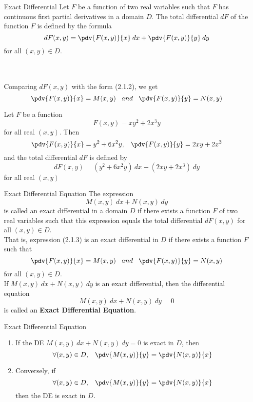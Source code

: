 \begin{definition}{Exact Differential}{}
    Let $F$ be a function of two real variables such that  $F$ has continuous first partial derivatives in a domain $D$. The total differential $dF$ of the function $F$ is defined by the formula
    \[
        d{F(x,y)} = \pdv{F(x,y)}{x} \: dx + \pdv{F(x,y)}{y} \: dy
    \]
    for all $(x,y) \in D$.
\end{definition} \\~\\

Comparing $dF(x,y)$ with the form (2.1.2), we get
\[
    \pdv{F(x,y)}{x} = M(x,y) \;\;\; and \;\;\;
    \pdv{F(x,y)}{y} = N(x,y)
\]

\begin{example}{}{}
    Let $F$ be a function \[
        F(x,y) = xy^2 + 2x^3y
    \] for all real $(x,y)$. Then
    \[
        \pdv{F(x,y)}{x} = y^2 + 6x^2y ,\;\;\;
        \pdv{F(x,y)}{y} = 2xy + 2x^3
    \]
    and the total differential $dF$ is defined by \[
        dF(x,y) = (y^2 + 6x^2y) \: dx + (2xy + 2x^3) \: dy
    \]
    for all real $(x,y)$
\end{example}

\begin{definition}{Exact Differential Equation}{}
    The expression
    \begin{equation}
        M(x,y) \: d{x} + N(x,y) \: d{y}
    \end{equation}
    is called an exact differential in a domain $D$ if there exists a function $F$ of two real variables such that this expression equals the total differential $dF(x,y)$ for all $(x,y) \in D$. \\
    That is, expression (2.1.3) is an exact differential in $D$ if there exists a function $F$ such that
\[
    \pdv{F(x,y)}{x} = M(x,y) \;\;\; and \;\;\;
    \pdv{F(x,y)}{y} = N(x,y)
\]
for all $(x,y) \in D$. \\
If $M(x,y) \: d{x} + N(x,y) \: d{y}$ is an exact differential, then the differential equation
\[ M(x,y) \: d{x} + N(x,y) \: d{y} = 0 \]
is called an \textbf{Exact Differential Equation}.
\end{definition}

\begin{theorem}{Exact Differential Equation}{}
    \begin{enumerate}
        \item If the DE $M(x,y) \: d{x} + N(x,y) \: d{y} = 0$ is exact in $D$, then
            \[ \forall (x,y)\in D, \;\;\; \pdv{M(x,y)}{y} = \pdv{N(x,y)}{x} \]
        \item Conversely, if 
            \[ \forall (x,y)\in D, \;\;\; \pdv{M(x,y)}{y} = \pdv{N(x,y)}{x} \]
        then the DE is exact in $D$.
    \end{enumerate}
\end{theorem} \\~\\

